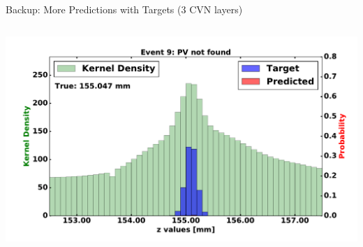 \begin{frame}{Backup: More Predictions with Targets (3 CVN layers)}
\begin{columns}[c]
\begin{center}
           \includegraphics[width=1\textwidth, height=0.45\textwidth, trim=18 0 18 0]{images/120000_3layer_56.pdf}
       \end{center}
  \end{columns}
\end{frame}






